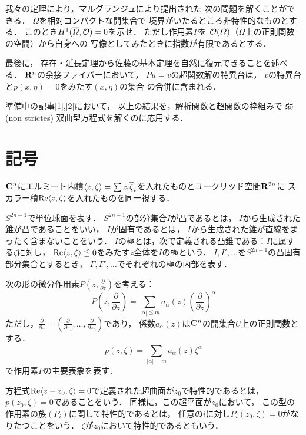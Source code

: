 我々の定理により，マルグランジュにより提出された
次の問題を解くことができる．
\(\varOmega\)を相対コンパクトな開集合で
境界がいたるところ非特性的なものとする．
このとき\(H^{1}(\overline{\varOmega},\mathcal{O})=0\)を示せ．
ただし作用素\(P\)を
\(\mathcal{O}(\varOmega)\)（\(\varOmega\)上の正則関数の空間）から自身への
写像としてみたときに指数が有限であるとする．

最後に，
存在・延長定理から佐藤の基本定理を自然に復元できることを述べる．
\(\mathbf{R}^n\)の余接ファイバーにおいて，
\(Pu=v\)の超関数解の特異台は，
\(v\)の特異台と\(p(x,\eta)=0\)をみたす\((x,\eta)\)の集合
の合併に含まれる．

準備中の記事[1],[2]において，
以上の結果を，解析関数と超関数の枠組みで
弱 (non strictes) 双曲型方程式を解くのに応用する．


\section[記号]{記号}\label{sec:1}

\(\mathbf{C}^{n}\)にエルミート内積\(
    \inner<z,\zeta>
    =\sum z_{i}\overline{\zeta}_{i}
\)を入れたものとユークリッド空間\(\mathbf{R}^{2n}\)に
スカラー積\(\Re\inner<z,\zeta>\)を入れたものを同一視する．

\(S^{2n-1}\)で単位球面を表す．
\(S^{2n-1}\)の部分集合\(I\)が凸であるとは，
\(I\)から生成された錐が凸であることをいい，
\(I\)が固有であるとは，
\(I\)から生成された錐が直線をまったく含まないことをいう．
\(I\)の極とは，次で定義される凸錐である：\(I\)に属する\(\zeta\)に対し，
\(\Re\inner<z,\zeta>\leqq0\)をみたす\(z\)全体を\(I\)の極という．
\(I,I',\dots\)を\(S^{2n-1}\)の凸固有部分集合とするとき，
\(\varGamma,\varGamma',\dots\)でそれぞれの極の内部を表す．

次の形の微分作用素\(P(z,\frac{\partial}{\partial z})\)を考える：
\[
    P\left(z,\frac{\partial}{\partial z}\right)
    =
    \sum_{\left|\alpha\right|\leqq m}^{}a_{\alpha}(z)\left(\frac{\partial}{\partial z}\right)^{\alpha}
\]
ただし，\(\frac{\partial}{\partial z}=\left(\frac{\partial}{\partial z_{1}},\dots,\frac{\partial}{\partial z_{n}}\right)\)であり，
係数\(a_{\alpha}(z)\)は\(\mathbf{C}^{n}\)の開集合\(U\)上の正則関数とする．
\[
    p\left(z,\zeta\right)
    =
    \sum_{\left|\alpha\right|= m}^{}a_{\alpha}(z)\zeta^{\alpha}
\]
で作用素\(P\)の主要表象を表す．

方程式\(\Re\inner<z-z_{0},\zeta>=0\)で定義された超曲面が\(z_{0}\)で特性的であるとは，
\(p(z_{0},\zeta)=0\)であることをいう．
同様に，この超平面が\(z_{0}\)において，
この型の作用素の族\((P_{i})\)に関して特性的であるとは，
任意の\(i\)に対し\(P_{i}(z_{0},\zeta)=0\)がなりたつことをいう．
\(\zeta\)が\(z_{0}\)において特性的であるともいう．


